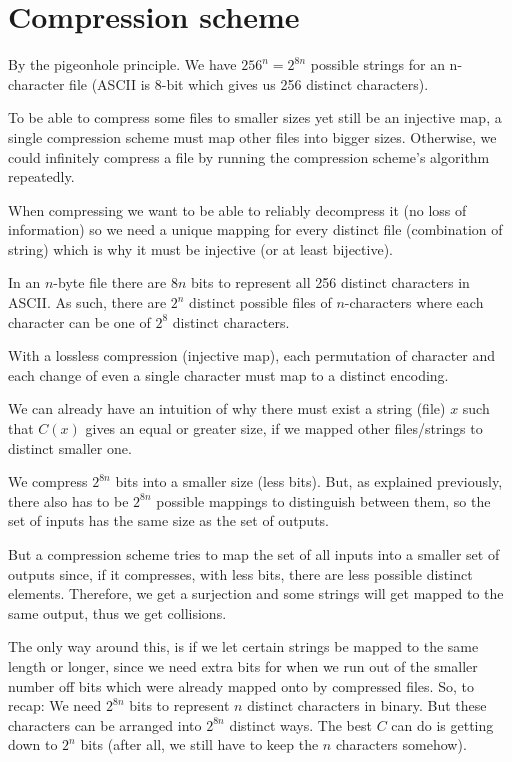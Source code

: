 \documentclass[11pt,letterpaper]{article}
\begin{document}
	\section{Compression scheme}
		By the pigeonhole principle.
		\newline
		\newline
		We have $256^n = 2^{8n}$ possible strings for an n-character file (ASCII is 8-bit which gives us 256 distinct characters).
		
		To be able to compress some files to smaller sizes yet still be an injective map, a single compression scheme must map other files into bigger sizes.
		Otherwise, we could infinitely compress a file by running the compression scheme's algorithm repeatedly.
		
		When compressing we want to be able to reliably decompress it (no loss of information) so we need a unique mapping for every distinct file (combination of string) which is why it must be injective (or at least bijective).
		
		In an $n$-byte file there are $8n$ bits to represent all 256 distinct characters in ASCII.
		As such, there are $2^n$ distinct possible files of $n$-characters where each character can be one of $2^8$ distinct characters.
		
		With a lossless compression (injective map), each permutation of character and each change of even a single character must map to a distinct encoding.
		
		We can already have an intuition of why there must exist a string (file) $x$ such that $C(x)$ gives an equal or greater size, if we mapped other files/strings to distinct smaller one.
		
		We compress $2^{8n}$ bits into a smaller size (less bits).
		But, as explained previously, there also has to be $2^{8n}$ possible mappings to distinguish between them, so the set of inputs has the same size as the set of outputs.
		
		But a compression scheme tries to map the set of all inputs into a smaller set of outputs since, if it compresses, with less bits, there are less possible distinct elements.
		Therefore, we get a surjection and some strings will get mapped to the same output, thus we get collisions.
		
		The only way around this, is if we let certain strings be mapped to the same length or longer, since we need extra bits for when we run out of the smaller number off bits which were already mapped onto by compressed files.
		\newline
		\newline
		So, to recap:
		\newline
		\newline
		We need $2^{8n}$ bits to represent $n$ distinct characters in binary.
		But these characters can be arranged into $2^{8n}$ distinct ways.
		The best $C$ can do is getting down to $2^n$ bits (after all, we still have to keep the $n$ characters somehow).
		
\end{document}
